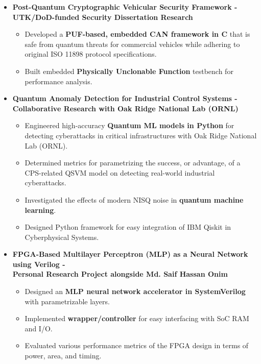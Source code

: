 \documentclass[line,margin,9pt]{res}
\begin{document}
\begin{resume}
\begin{itemize}
\item \textbf{Post-Quantum Cryptographic Vehicular Security Framework - \\
	\small{UTK/DoD-funded Security Dissertation Research}} 
\begin{itemize}
\item Developed a \textbf{PUF-based, embedded CAN framework in C} that is safe from quantum threats for commercial vehicles while adhering to original ISO 11898 protocol specifications.
\item Built embedded \textbf{Physically Unclonable Function} testbench for performance analysis.
\end{itemize}

\item \textbf{Quantum Anomaly Detection for Industrial Control Systems - \\
	\small{Collaborative Research with Oak Ridge National Lab (ORNL)}}  
\begin{itemize}
\item Engineered high-accuracy \textbf{Quantum ML models in Python} for detecting cyberattacks in critical infrastructures with Oak Ridge National Lab (ORNL).
\item Determined metrics for parametrizing the success, or advantage, of a CPS-related QSVM model on detecting real-world industrial cyberattacks.
\item Investigated the effects of modern NISQ noise in \textbf{quantum machine learning}.
\item Designed Python framework for easy integration of IBM Qiskit in Cyberphysical Systems.
\end{itemize}

\item \textbf{FPGA-Based Multilayer Perceptron (MLP) as a Neural Network using Verilog - \\
	\small{Personal Research Project alongside Md. Saif Hassan Onim}} 
\begin{itemize}
\item Designed an \textbf{MLP neural network accelerator in SystemVerilog} with parametrizable layers.
\item Implemented \textbf{wrapper/controller} for easy interfacing with SoC RAM and I/O.
\item Evaluated various performance metrics of the FPGA design in terms of power, area, and timing.
\end{itemize}


\end{itemize}
\end{resume}
\end{document}
